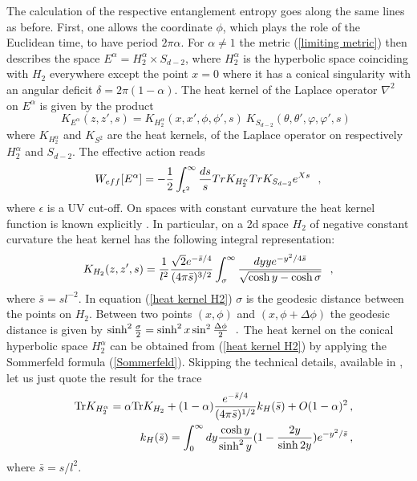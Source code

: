 \documentclass[12pt]{article}
\def\Tr{\hbox{Tr}}
\def\be{\begin{eqnarray}}
\def\ee{\end{eqnarray}}
\def\lb{\label}
\def\o{\over}
\begin{document}
 The calculation
of  the respective entanglement entropy goes along the same lines as before. First, one allows the coordinate $\phi$, which plays the role of the Euclidean time, to
have period $2\pi\alpha$. For $\alpha\neq 1$ the metric (\ref{limiting metric}) then describes the
space $E^\alpha = H^\alpha_2\times S_{d-2}$, where $H^\alpha_2$
is the hyperbolic space coinciding with $H_2$ everywhere except the 
point $x=0$ where it has a conical singularity with an
angular deficit $\delta=2\pi (1-\alpha )$.      The heat kernel of the Laplace operator $\nabla^2$ on $E^\alpha$ is given by the product 
$$
K_{E^\alpha}(z,z',s)=K_{H_2^\alpha}(x,x',\phi , \phi ',s)~K_{S_{d-2}}(\theta ,
\theta ', \varphi, \varphi ',s)~~
$$
where $K_{H_2^\alpha}$ and $K_{S^2}$ are the heat kernels, of the Laplace operator on respectively $H_2^\alpha$ and $S_{d-2}$.
The effective action reads
\begin{equation}
W_{eff}[E^\alpha ]=-{1\over 2}\int^\infty_{\epsilon^2}{ds\over s} Tr K_{H_2^\alpha} Tr K_{S_{d-2}} e^{Xs}~~,
\label{effective action on E}
\end{equation}
where $\epsilon$ is a UV cut-off.
On spaces with constant curvature the heat kernel function 
is known explicitly \cite{Camporesi:1990wm}. In particular, on a
2d space $H_2$ of  negative constant curvature the heat kernel has the following integral representation:
\begin{equation}
K_{H_2}(z,z',s)={1\over l^2}{\sqrt{2}e^{-{\bar{s}/ 4}}
\over (4\pi \bar{s})^{3/2}}\int_\sigma^\infty {dyye^{-{y^2/ 4\bar{s}}}\over
\sqrt{\cosh y-\cosh \sigma }}~~,
\label{heat kernel H2}
\end{equation}
where $\bar{s}=sl^{-2}$. In equation (\ref{heat kernel H2}) $\sigma$ is the geodesic
distance between  
the points  on $H_2$.  Between two points $(x, \phi )$ 
and $(x, \phi+\Delta \phi )$ the geodesic distance is given by
$
\sinh^2 {\sigma \over 2}=\sinh^2 x \sin^2 {\Delta \phi \over 2}~~.
$
The heat kernel on the conical hyperbolic space $H_2^\alpha$ can be obtained from (\ref{heat kernel H2})  by applying the Sommerfeld formula (\ref{Sommerfeld}). Skipping                the technical details,   available in   \cite{Mann:1997hm},     let us just quote the result for the trace
\be
&&\Tr K_{H^\alpha_2}=\alpha \Tr K_{H_2}+(1-\alpha){e^{-\bar{s}/4}\o (4\pi\bar{s})^{1/2}}k_H(\bar{s})+O(1-\alpha)^2\, , \nonumber \\
&&k_H (\bar{s})=\int^\infty_0 dy {\cosh y\over \sinh^2y}(1-{2y\over \sinh 2y})
e^{-{y^2/ \bar{s}}}\, ,
\lb{trace K conical H2}
\ee
where $\bar{s}=s/l^2$.  
\end{document}
